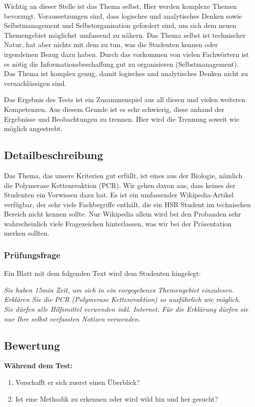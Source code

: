 Wichtig an dieser Stelle ist das Thema selbst. Hier werden komplexe Themen bevorzugt. Voraussetzungen sind, dass logisches und analytisches Denken sowie Selbstmanagement und Selbstorganisation gefordert sind, um sich dem neuen Themengebiet möglichst umfassend zu nähern. Das Thema selbst ist technischer Natur, hat aber nichts mit dem zu tun, was die Studenten kennen oder irgendeinen Bezug dazu haben. Durch das vorkommen von vielen Fachwörtern ist es nötig die Informationsbeschaffung gut zu organisieren (Selbstmanagement). Das Thema ist komplex genug, damit logisches und analytisches Denken nicht zu vernachlässigen sind.

Das Ergebnis des Tests ist ein Zusammenspiel aus all diesen und vielen weiteren Kompetenzen. Aus diesem Grunde ist es sehr schwierig, diese anhand der Ergebnisse und Beobachtungen zu trennen. Hier wird die Trennung soweit wie möglich angestrebt.

\subsection{Detailbeschreibung}

Das Thema, das unsere Kriterien gut erfüllt, ist eines aus der Biologie, nämlich die Polymerase Kettenreaktion (PCR). Wir gehen davon aus, dass keines der Studenten ein Vorwissen dazu hat. Es ist ein umfassender Wikipedia-Artikel verfügbar, der sehr viele Fachbegriffe enthält, die ein HSR Student im technischen Bereich nicht kennen sollte. Nur Wikipedia allein wird bei den Probanden sehr wahrscheinlich viele Fragezeichen hinterlassen, was wir bei der Präsentation merken sollten. 

\subsubsection{Prüfungsfrage}
Ein Blatt mit dem folgenden Text wird dem Studenten hingelegt:

\textit{Sie haben 15min Zeit, um sich in ein vorgegebenes Themengebiet einzulesen. \vspace*{2mm}
Erklären Sie die PCR (Polymerase Kettenreaktion) so ausführlich wie möglich. Sie dürfen alle Hilfsmittel verwenden inkl. Internet. Für die Erklärung dürfen sie nur Ihre selbst verfassten Notizen verwenden. }
\subsection{Bewertung}

\textbf{Während dem Test:}
\begin{enumerate}
\item Verschafft er sich zuerst einen Überblick?
\item Ist eine Methodik zu erkennen oder wird wild hin und her gesucht?
\end{enumerate}

